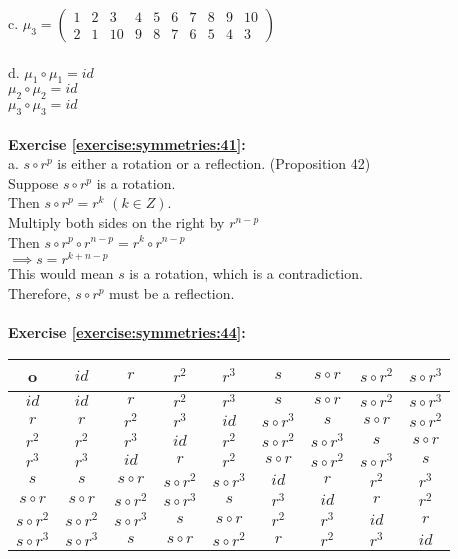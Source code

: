 c. $\mu_3=\begin{pmatrix}
1 & 2 & 3 & 4 & 5 & 6 & 7 & 8 & 9 & 10\\
2 & 1 & 10 & 9 & 8 & 7 & 6 & 5 & 4 & 3
\end{pmatrix}$\\
\\
d. $\mu_1\circ\mu_1=id$\\
$\mu_2\circ\mu_2=id$\\
$\mu_3\circ\mu_3=id$\\
\\
\textbf{Exercise \ref{exercise:symmetries:41}:}\\
a. $s\circ r^p$ is either a rotation or a reflection. (Proposition 42)\\
Suppose $s\circ r^p$ is a rotation.\\
Then $s\circ r^p=r^k$ $(k\in Z)$.\\
Multiply both sides on the right by $r^{n-p}$\\
Then $s\circ r^p\circ r^{n-p}=r^k\circ r^{n-p}$\\
$\implies s=r^{k+n-p}$\\
This would mean $s$ is a rotation, which is a contradiction.\\
Therefore, $s\circ r^p$ must be a reflection.\\
\\
\textbf{Exercise \ref{exercise:symmetries:44}:}\\
\begin{center}
	\begin{tabular}{c| c c c c c c c c }
		o & $id$ & $r$ & $r^2$ & $r^3$ & $s$ & $s\circ r$ & $s\circ r^2$ & $s\circ r^3$\\
		\hline
		$id$ & $id$ & $r$ & $r^2$ & $r^3$ & $s$ & $s\circ r$ & $s\circ r^2$ & $s\circ r^3$\\
		$r$ & $r$ & $r^2$ & $r^3$ & $id$ & $s\circ r^3$ & $s$ & $s\circ r$ & $s\circ r^2$\\
		$r^2$ & $r^2$ & $r^3$ & $id$ & $r^2$ & $s\circ r^2$ & $s\circ r^3$ & $s$ & $s\circ r$\\
		$r^3$ & $r^3$ & $id$ & $r$ & $r^2$ & $s\circ r$ & $s\circ r^2$ & $s\circ r^3$ & $s$\\
		$s$ & $s$ & $s\circ r$ & $s\circ r^2$ & $s\circ r^3$ & $id$ & $r$ & $r^2$ & $r^3$\\
		$s\circ r$ & $s\circ r$ & $s\circ r^2$ & $s\circ r^3$ & $s$ & $r^3$ & $id$ & $r$ & $r^2$\\
		$s\circ r^2$ & $s\circ r^2$ & $s\circ r^3$ & $s$ & $s\circ r$ & $r^2$ & $r^3$ & $id$ & $r$\\
		$s\circ r^3$ & $s\circ r^3$ & $s$ & $s\circ r$ & $s\circ r^2$ & $r$ & $r^2$ & $r^3$ & $id$
	\end{tabular}
\end{center}
